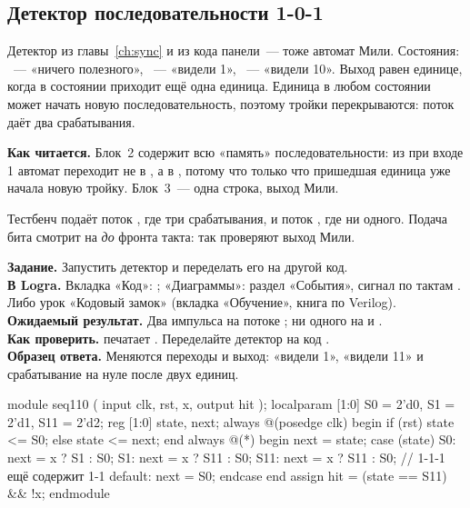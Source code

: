 \subsection{Детектор последовательности 1-0-1}

Детектор из главы~\ref{ch:sync} и из кода панели~--- тоже автомат Мили.
Состояния: ~--- «ничего полезного», ~--- «видели 1»,
~--- «видели 10». Выход  равен единице, когда в состоянии
 приходит ещё одна единица. Единица в любом состоянии может начать
новую последовательность, поэтому тройки перекрываются: поток 
даёт два срабатывания.


\textbf{Как читается.} Блок~2 содержит всю «память» последовательности: из
 при входе 1 автомат переходит не в , а в , потому
что только что пришедшая единица уже начала новую тройку. Блок~3~--- одна
строка, выход Мили.

Тестбенч  подаёт поток , где три
срабатывания, и поток , где ни одного. Подача бита
 смотрит на  \emph{до} фронта такта: так проверяют
выход Мили.

\begin{diybox}
\textbf{Задание.} Запустить детектор и переделать его на другой код.\\
\textbf{В Logra.} Вкладка «Код»: ; «Диаграммы»: раздел «События»,
сигнал  по тактам . Либо урок «Кодовый замок»
(вкладка «Обучение», книга по Verilog).\\
\textbf{Ожидаемый результат.} Два импульса  на потоке ;
ни одного на  и .\\
\textbf{Как проверить.}  печатает .
 Переделайте детектор на код .\\
\textbf{Образец ответа.} Меняются переходы и выход: «видели 1», «видели 11» и
срабатывание на нуле после двух единиц.
\end{diybox}

\begin{vcode}
module seq110 (
    input  clk, rst, x,
    output hit
);
    localparam [1:0] S0 = 2'd0, S1 = 2'd1, S11 = 2'd2;
    reg [1:0] state, next;
    always @(posedge clk) begin
        if (rst) state <= S0;
        else     state <= next;
    end
    always @(*) begin
        next = state;
        case (state)
            S0:      next = x ? S1 : S0;
            S1:      next = x ? S11 : S0;
            S11:     next = x ? S11 : S0;   // 1-1-1 ещё содержит 1-1
            default: next = S0;
        endcase
    end
    assign hit = (state == S11) && !x;
endmodule
\end{vcode}


